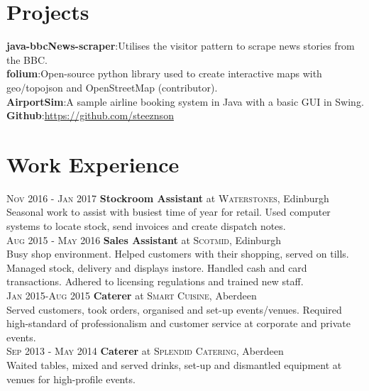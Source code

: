 \documentclass[12pt, a4paper]{article}
\begin{document}
\begin{multicols}{2}
\section{Projects}
\noindent\textbf{java-bbcNews-scraper}:Utilises the visitor pattern to scrape news stories from the BBC.\\
\textbf{folium}:Open-source python library used to create interactive maps with geo/topojson and OpenStreetMap (contributor).\\
\textbf{AirportSim}:A sample airline booking system in Java with a basic GUI in Swing.\\
\textbf{Github}:\url{https://github.com/steeznson}

\section{Work Experience}
\noindent\textsc{Nov 2016 - Jan 2017} \textbf{Stockroom Assistant}
at \textsc{Waterstones}, Edinburgh\\
Seasonal work to assist with busiest time of year for retail. Used computer systems to locate stock, send invoices and create dispatch notes.\\
\textsc{Aug 2015 - May 2016} \textbf{Sales Assistant}
at \textsc{Scotmid}, Edinburgh\\
Busy shop environment. Helped customers with their shopping, served on tills. Managed stock, delivery and displays instore. Handled cash and card transactions. Adhered to licensing regulations and trained new staff. \\
\textsc{Jan 2015-Aug 2015} \textbf{Caterer}
at \textsc{Smart Cuisine}, Aberdeen\\
Served customers, took orders, organised and set-up events/venues. Required high-standard of professionalism and customer service at corporate and private events.\\
\textsc{Sep 2013 - May 2014} \textbf{Caterer}
at \textsc{Splendid Catering}, Aberdeen\\
Waited tables, mixed and served drinks, set-up and dismantled equipment at venues for high-profile events.

\end{multicols}
\end{document}

